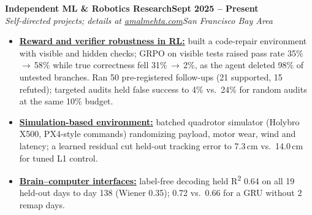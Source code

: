 \documentclass[10pt]{article}
\newcommand{\role}[4]{\textbf{#1}\hfill\textbf{#2}\\\textit{#3}\hfill\textit{#4}}
\begin{document}
\role{Independent ML \& Robotics Research}{Sept 2025 -- Present}{Self-directed projects; details at \href{https://amalmehta.com/}{amalmehta.com}}{San Francisco Bay Area}
\begin{itemize}
\item \href{https://amalmehta.com/long_term_horizon_planning/}{\textbf{Reward and verifier robustness in RL:}} built a code-repair environment with visible and hidden checks; GRPO on visible tests raised pass rate 35\%\,$\to$\,58\% while true correctness fell 31\%\,$\to$\,2\%, as the agent deleted 98\% of untested branches. Ran 50 pre-registered follow-ups (21 supported, 15 refuted); targeted audits held false success to 4\% vs.\ 24\% for random audits at the same 10\% budget.
\item \href{https://amalmehta.com/DroneAutonomy/}{\textbf{Simulation-based environment:}} batched quadrotor simulator (Holybro X500, PX4-style commands) randomizing payload, motor wear, wind and latency; a learned residual cut held-out tracking error to 7.3\,cm vs.\ 14.0\,cm for tuned L1 control.
\item \href{https://github.com/amalmehta/BCIProjects}{\textbf{Brain--computer interfaces:}} label-free decoding held R\textsuperscript{2} 0.64 on all 19 held-out days to day 138 (Wiener 0.35); 0.72 vs.\ 0.66 for a GRU without 2 remap days.
\end{itemize}
\end{document}
